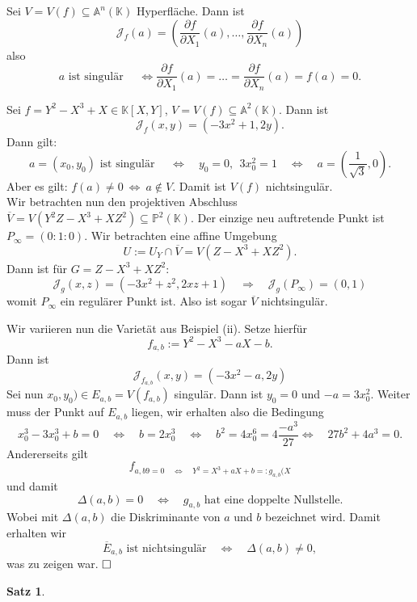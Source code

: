 \documentclass[11pt]{book}
\newtheorem{theorem}{Satz}[section]
\theoremstyle{nonumberbreak}
\newenvironment{ex}[1][]{\ifthenelse{\equal{#1}{}}{\example}{\example[#1]}\rm}{\endexample}
\begin{document}
\begin{spacing}{1.3}
\begin{ex}
\begin{compactenum}
\item Sei $V=V(f) \subseteq \mathbb{A}^n(\mathbb{K})$ Hyperfläche. Dann ist 
$$\mathcal{J}_f(a)= \left( \frac{\partial f}{\partial X_1}(a), \ldots, \frac{\partial f}{\partial X_n}(a) \right)$$
also 
$$ a \textrm{ ist singulär } \quad \Longleftrightarrow \frac{\partial f }{\partial X_1}(a)= \ldots = \frac{\partial f}{\partial X_n}(a) = f(a)=0.$$
\item Sei $f= Y^2-X^3+X \in \mathbb{K}[X,Y]$, $V=V(f) \subseteq \mathbb{A}^2(\mathbb{K})$. Dann ist
    $$\mathcal{J}_f(x,y) = \left(-3x^2+1, 2y\right).$$
    Dann gilt: 
    $$a=(x_0, y_0) \textrm{ ist singulär } \quad \Longleftrightarrow \quad y_0=0,\ \  3x_0^2=1 \quad \Longleftrightarrow \quad a=\left(\frac{1}{\sqrt{3}}, 0 \right).$$
    Aber es gilt: $f(a) \neq 0 \ \Longleftrightarrow \ a \notin V$. Damit ist $V(f)$ nichtsingulär.\\
    Wir betrachten nun den projektiven Abschluss $\overline{V}=V(Y^2Z-X^3+XZ^2)\subseteq \mathbb{P}^2(\mathbb{K})$. Der einzige neu auftretende Punkt ist $P_{\infty}=(0:1:0)$. Wir betrachten eine affine Umgebung
    $$U:= U_Y \cap \overline{V} = V(Z-X^3+XZ^2).$$
    Dann ist für $G=Z-X^3+XZ^2$:
    $$\mathcal{J}_g(x,z) = (-3x^2+z^2, 2xz +1)\quad \Longrightarrow \quad  \mathcal{J}_g(P_{\infty}) = (0,1)$$
    womit $P_{\infty}$ ein regulärer Punkt ist. Also ist sogar $\overline{V}$ nichtsingulär.
\item Wir variieren nun die Varietät aus Beispiel (ii). Setze hierfür
$$f_{a,b}:= Y^2-X^3-aX-b.$$
 Dann ist
 $$\mathcal{J}_{f_{a,b}}(x,y) = (-3x^2-a, 2y)$$
 Sei nun $x_0, y_0) \in E_{a,b}=V(f_{a,b})$ singulär. Dann ist $y_0=0$ und $-a= 3x_0^2$. Weiter muss der Punkt auf $E_{a,b}$ liegen, wir erhalten also die Bedingung
 $$x_0^3-3x_0^3+b = 0 \quad \Longleftrightarrow \quad b = 2x_0^3 \quad \Longleftrightarrow \quad b^2= 4x_0^6 = 4 \frac{-a^3}{27} \Longleftrightarrow \quad 27b^2+4a^3=0.$$
 Andererseits gilt
 $$f_{a,b9=0 \quad \Longleftrightarrow \quad Y^2 = X^3+ aX + b =:g_{a,b}(X}$$
 und damit 
 $$\Delta(a,b) = 0 \quad \Longleftrightarrow \quad g_{a,b} \textrm{ hat eine doppelte Nullstelle.}$$
 Wobei mit $\Delta(a,b)$ die Diskriminante von $a$ und $b$ bezeichnet wird. Damit erhalten wir 
 $$\overline{E}_{a,b} \textrm{ ist nichtsingulär} \quad \Longleftrightarrow \quad \Delta(a,b) \neq 0,$$
 was zu zeigen war. $\hfill \Box$
\end{compactenum}
\end{ex}


\begin{theorem} %


\end{theorem}
\end{spacing}
\end{document}
